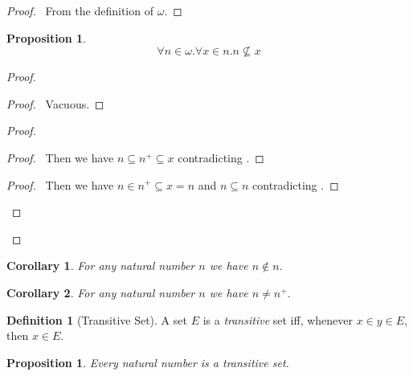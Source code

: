 \documentclass{report}
\let\qed\relax
\newtheorem{prop}[ax]{Proposition}
\newtheorem{cor}{Corollary}[ax]
\theoremstyle{definition}
\newtheorem{df}[ax]{Definition}
\begin{document}
\begin{proof}
\pf\ From the definition of $\omega$. \qed
\end{proof}

\begin{prop}
\label{prop:natural_number_not_subset}
\[ \forall n \in \omega. \forall x \in n. n \not\subseteq x \]
\end{prop}

\begin{proof}
\pf
{}
\begin{proof}
	\pf\ Vacuous.
\end{proof}
\begin{proof}
	\begin{proof}
		\pf\ Then we have $n \subseteq n^+ \subseteq x$ contradicting .
	\end{proof}
	\begin{proof}
		\pf\ Then we have $n \in n^+ \subseteq x = n$ and $n \subseteq n$ contradicting .
	\end{proof}
\end{proof}
\qed
\end{proof}

\begin{cor}
For any natural number $n$ we have $n \notin n$.
\end{cor}

\begin{cor}
For any natural number $n$ we have $n \neq n^+$.
\end{cor}

\begin{df}[Transitive Set]
A set $E$ is a \emph{transitive} set iff, whenever $x \in y \in E$, then $x \in E$.
\end{df}

\begin{prop}
\label{prop:natural_number_transitive}
Every natural number is a transitive set.
\end{prop}
\end{document}
